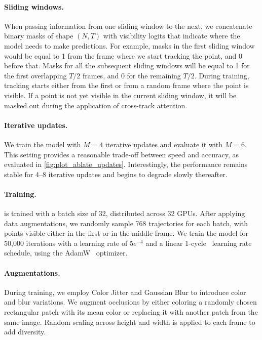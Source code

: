 \paragraph{Sliding windows.}

When passing information from one sliding window to the next, we concatenate binary masks of shape $(N, T)$ with visibility logits that indicate where the model needs to make predictions.
For example, masks in the first sliding window would be equal to 1 from the frame where we start tracking the point, and 0 before that.
Masks for all the subsequent sliding windows will be equal to 1 for the first overlapping $T/2$ frames, and 0 for the remaining $T/2$.
During training, tracking starts either from the first or from a random frame where the point is visible.
If a point is not yet visible in the current sliding window, it will be masked out during the application of cross-track attention.

\paragraph{Iterative updates.}

We train the model with $M=4$ iterative updates and evaluate it with $M=6$.
This setting provides a reasonable trade-off between speed and accuracy, as evaluated in \cref{fig:plot_ablate_updates}. Interestingly, the performance remains stable for 4--8 iterative updates and begins to degrade slowly thereafter.

\paragraph{Training.}

\method is trained with a batch size of 32, distributed across 32 GPUs.
After applying data augmentations, we randomly sample 768 trajectories for each batch, with points visible either in the first or in the middle frame.
We train the model for 50,000 iterations with a learning rate of $5e^{-4}$ and a linear 1-cycle~\cite{smith2019super} learning rate schedule, using the AdamW~\cite{loshchilov2017decoupled} optimizer.

\paragraph{Augmentations.}

During training, we employ Color Jitter and Gaussian Blur to introduce color and blur variations.
We augment occlusions by either coloring a randomly chosen rectangular patch with its mean color or replacing it with another patch from the same image.
Random scaling across height and width is applied to each frame to add diversity.

